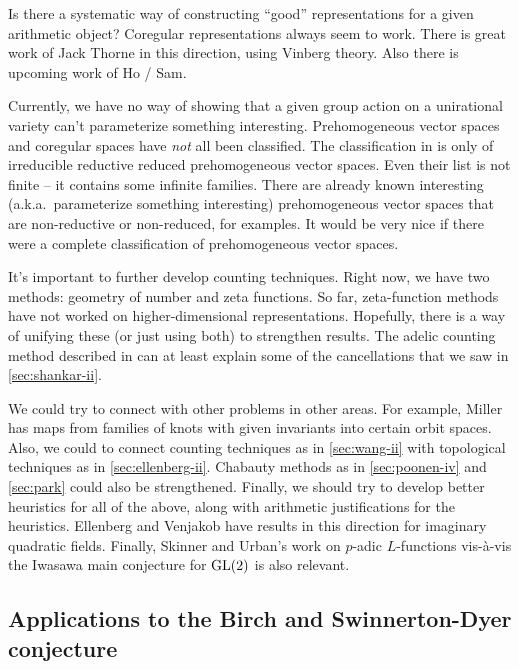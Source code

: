 Is there a systematic way of constructing ``good'' representations for a given 
arithmetic object? Coregular representations always seem to work. There is 
great work of Jack Thorne \cite{t13} in this direction, using Vinberg theory. 
Also there is upcoming work of Ho / Sam. 

Currently, we have no way of showing that a given group action on a 
unirational variety can't parameterize something interesting. Prehomogeneous 
vector spaces and coregular spaces have \emph{not} all been classified. The 
classification in \cite{sk77} is only of irreducible reductive reduced 
prehomogeneous vector spaces. Even their list is not finite -- it contains 
some infinite families. There are already known interesting 
(a.k.a.~parameterize something interesting) prehomogeneous 
vector spaces that are non-reductive or non-reduced, for examples. It would be 
very nice if there were a complete classification of prehomogeneous vector 
spaces. 

It's important to further develop counting techniques. Right now, we have 
two methods: geometry of number and zeta functions. So far, zeta-function 
methods have not worked on higher-dimensional representations. Hopefully, there 
is a way of unifying these (or just using both) to strengthen results. The 
adelic counting method described in \cite{p13} can at least explain some of the 
cancellations that we saw in \autoref{sec:shankar-ii}. 

We could try to connect with other problems in other areas. For example, 
Miller has maps from families of knots with given invariants into certain 
orbit spaces. Also, we could to connect counting techniques as in 
\autoref{sec:wang-ii} with topological techniques as in 
\autoref{sec:ellenberg-ii}. Chabauty methods as in \autoref{sec:poonen-iv} 
and \autoref{sec:park} could also be strengthened. Finally, we should try to 
develop better heuristics for all of the above, along with arithmetic 
justifications for the heuristics. Ellenberg and Venjakob have results in this 
direction for imaginary quadratic fields. Finally, Skinner and Urban's work 
\cite{su14} on $p$-adic $L$-functions vis-\`a-vis the Iwasawa main conjecture 
for $\operatorname{GL}(2)$ is also relevant. 





\subsection{Applications to the Birch and Swinnerton-Dyer conjecture}

